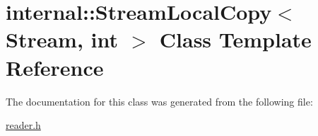 \hypertarget{a00285}{}\section{internal\+:\+:Stream\+Local\+Copy$<$ Stream, int $>$ Class Template Reference}
\label{a00285}


The documentation for this class was generated from the following file\+:\begin{DoxyCompactItemize}
\item 
\hyperlink{a00683}{reader.\+h}\end{DoxyCompactItemize}
